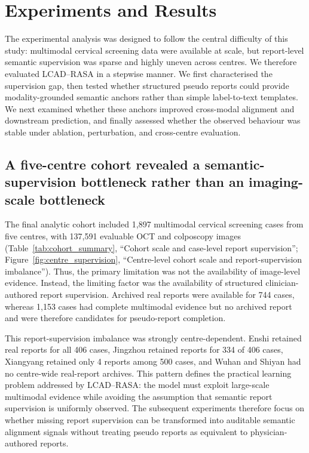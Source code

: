 \section{Experiments and Results}
\label{sec:experiments_results}

The experimental analysis was designed to follow the central difficulty of this study: multimodal cervical screening data were available at scale, but report-level semantic supervision was sparse and highly uneven across centres. We therefore evaluated LCAD--RASA in a stepwise manner. We first characterised the supervision gap, then tested whether structured pseudo reports could provide modality-grounded semantic anchors rather than simple label-to-text templates. We next examined whether these anchors improved cross-modal alignment and downstream prediction, and finally assessed whether the observed behaviour was stable under ablation, perturbation, and cross-centre evaluation.

\subsection{A five-centre cohort revealed a semantic-supervision bottleneck rather than an imaging-scale bottleneck}
\label{subsec:cohort_results}

The final analytic cohort included 1,897 multimodal cervical screening cases from five centres, with 137,591 evaluable OCT and colposcopy images (Table~\ref{tab:cohort_summary}, ``Cohort scale and case-level report supervision''; Figure~\ref{fig:centre_supervision}, ``Centre-level cohort scale and report-supervision imbalance''). Thus, the primary limitation was not the availability of image-level evidence. Instead, the limiting factor was the availability of structured clinician-authored report supervision. Archived real reports were available for 744 cases, whereas 1,153 cases had complete multimodal evidence but no archived report and were therefore candidates for pseudo-report completion.

This report-supervision imbalance was strongly centre-dependent. Enshi retained real reports for all 406 cases, Jingzhou retained reports for 334 of 406 cases, Xiangyang retained only 4 reports among 500 cases, and Wuhan and Shiyan had no centre-wide real-report archives. This pattern defines the practical learning problem addressed by LCAD--RASA: the model must exploit large-scale multimodal evidence while avoiding the assumption that semantic report supervision is uniformly observed. The subsequent experiments therefore focus on whether missing report supervision can be transformed into auditable semantic alignment signals without treating pseudo reports as equivalent to physician-authored reports.

